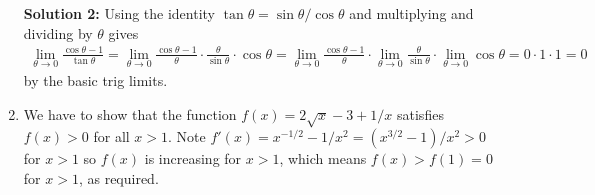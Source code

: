 \documentclass{article}
\newcommand{\ds}{\displaystyle}
\begin{document}
\begin{enumerate}
  \textbf{Solution 2:} Using the identity $\tan\theta = \sin\theta/\cos\theta$
  and multiplying and dividing by $\theta$ gives
  \begin{align*}
    \lim_{\theta\to 0} \frac{\cos\theta-1}{\tan\theta}
    = \lim_{\theta\to 0} \frac{\cos\theta-1}{\theta}
    \cdot \frac{\theta}{\sin\theta} \cdot \cos\theta
    = \lim_{\theta\to 0} \frac{\cos\theta-1}{\theta}
    \cdot \lim_{\theta\to 0}\frac{\theta}{\sin\theta} \cdot 
    \lim_{\theta\to 0} \cos\theta
    = 0 \cdot 1 \cdot 1 = 0
  \end{align*}
  by the basic trig limits.
\item We have to show that the function $\ds f(x)=2\sqrt{x}-3+1/x$ satisfies
  $f(x)>0$ for all $x>1$.  Note
  $f'(x)=x^{-1/2} - 1/x^2 = (x^{3/2}-1)/x^2 >0$ for $x>1$ so $f(x)$ is 
  increasing for $x>1$, which means $f(x)>f(1)=0$ for $x>1$, as required.
\end{enumerate}
\end{document}
